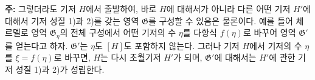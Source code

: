
\textbf{주:} 그렇더라도 기저 $H$에서 출발하여, 바로 $H$에 대해서가 아니라 다른 어떤 기저 $H'$에 대해서 기저 성질 1)과 2)를 갖는 영역 $\mathfrak G$를 구성할 수 있음은 물론이다. 예를 들어 체르멜로 영역 $\mathfrak G_\eta$의 전체 구성에서 어떤 기저의 수 $\eta$를 다항식 $f(\eta)$로 바꾸어 영역 $\mathfrak G'$를 얻는다고 하자. $\mathfrak G'$는 $\eta$도 $[H]$도 포함하지 않는다. 그러나 기저 $H$에서 기저의 수 $\eta$를 $\xi=f(\eta)$로 바꾸면, $H$는 다시 초월기저 $H'$가 되며, $\mathfrak G'$에 대해서는 $H'$에 관한 기저 성질 1)과 2)가 성립한다.
